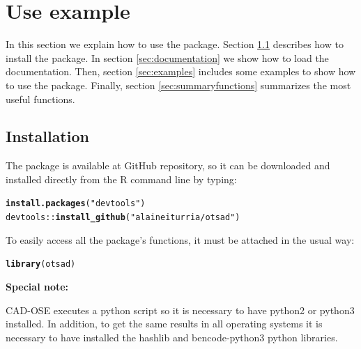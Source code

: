 \documentclass[a4paper]{article}\usepackage[]{graphicx}\usepackage[]{color}
\makeatletter
\newcommand{\hlstr}[1]{\textcolor[rgb]{0.192,0.494,0.8}{#1}}%
\newcommand{\hlopt}[1]{\textcolor[rgb]{0,0,0}{#1}}%
\newcommand{\hlstd}[1]{\textcolor[rgb]{0.345,0.345,0.345}{#1}}%
\newcommand{\hlkwd}[1]{\textcolor[rgb]{0.737,0.353,0.396}{\textbf{#1}}}%
\newenvironment{kframe}{%
 \def\at@end@of@kframe{}%
 \ifinner\ifhmode%
  \def\at@end@of@kframe{\end{minipage}}%
  \begin{minipage}{\columnwidth}%
 \fi\fi%
 \def\FrameCommand##1{\hskip\@totalleftmargin \hskip-\fboxsep
 \colorbox{shadecolor}{##1}\hskip-\fboxsep
     \hskip-\linewidth \hskip-\@totalleftmargin \hskip\columnwidth}%
 \MakeFramed {\advance\hsize-\width
   \@totalleftmargin\z@ \linewidth\hsize
   \@setminipage}}%
 {\par\unskip\endMakeFramed%
 \at@end@of@kframe}
\newenvironment{knitrout}{}{} %
\makeatother
\begin{document}
\section{Use example}\label{sec:examplesec}

In this section we explain how to use the package. Section \ref{sec:installation} describes  how to install the package. In section \ref{sec:documentation} we show how to load the documentation. Then, section \ref{sec:examples} includes some examples to show how to use the package. Finally, section \ref{sec:summaryfunctions} summarizes the most useful functions.

\subsection{Installation}\label{sec:installation}

The  package is available at GitHub repository, so it can be downloaded and installed directly from the R command line by typing:

\begin{knitrout}
\color{fgcolor}\begin{kframe}
\begin{alltt}
\hlkwd{install.packages}\hlstd{(}\hlstr{"devtools"}\hlstd{)}
\hlstd{devtools}\hlopt{::}\hlkwd{install_github}\hlstd{(}\hlstr{"alaineiturria/otsad"}\hlstd{)}
\end{alltt}
\end{kframe}
\end{knitrout}

To easily access all the package’s functions, it must be attached in the usual way:

\begin{knitrout}
\color{fgcolor}\begin{kframe}
\begin{alltt}
\hlkwd{library}\hlstd{(otsad)}
\end{alltt}
\end{kframe}
\end{knitrout}

\textbf{Special note: }

CAD-OSE executes a python script so it is necessary to have python2 or python3 installed. In addition, to get the same results in all operating systems it is necessary to have installed the hashlib and bencode-python3 python libraries.
\end{document}
